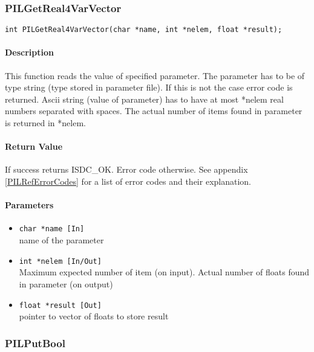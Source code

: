 
\subsubsection{PILGetReal4VarVector}

\begin{verbatim}
int PILGetReal4VarVector(char *name, int *nelem, float *result);
\end{verbatim}

\paragraph{Description\\}
This function reads the value of specified parameter. The parameter has
to be of type string (type stored in parameter file). If this is not the
case error code is returned. Ascii string (value of parameter) has to have
at most *nelem real numbers separated with spaces. The actual number
of items found in parameter is returned in *nelem.

\paragraph{Return Value\\}
If success returns ISDC\_OK. Error code otherwise. See appendix \ref{PILRefErrorCodes}
for a list of error codes and their explanation.

\paragraph{Parameters}
\begin{itemize}
\item
{\tt char *name [In] } \\
name of the parameter 
\item
{\tt int *nelem [In/Out]} \\
Maximum expected number of item (on input). Actual number of floats found in
parameter (on output)
\item
{\tt float *result [Out] } \\
pointer to vector of floats to store result
\end{itemize}



\subsubsection{PILPutBool}

